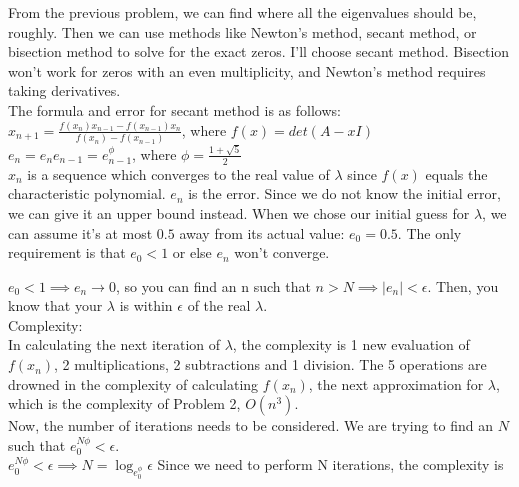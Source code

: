 \documentclass[12pt]{article}
\newenvironment{problem}[2][Problem]{\begin{trivlist}
\item[\hskip \labelsep {\bfseries #1}\hskip \labelsep {\bfseries #2.}]}{\end{trivlist}}
\begin{document}
\begin{problem}{4}
\end{problem}

From the previous problem, we can find where all the eigenvalues should be, roughly. Then we can use methods like Newton's method, secant method, or bisection method to solve for the exact zeros. I'll choose secant method. Bisection won't work for zeros with an even multiplicity, and Newton's method requires taking derivatives.
\\

The formula and error for secant method is as follows:
\\

$x_{n+1}=\frac{f(x_n)x_{n-1} - f(x_{n-1})x_n}{f(x_n)-f(x_{n-1})}$, where $f(x)=det(A-xI)$
\\

$e_n=e_n e_{n-1}=e_{n-1}^{\phi}$, where $\phi = \frac{1+\sqrt5}{2}$
\\

$x_n$ is a sequence which converges to the real value of $\lambda$ since $f(x)$ equals the characteristic polynomial. $e_n$ is the error. Since we do not know the initial error, we can give it an upper bound instead. When we chose our initial guess for $\lambda$, we can assume it's at most $0.5$ away from its actual value: $e_0=0.5$. The only requirement is that $e_0<1$ or else $e_n$ won't converge.

$e_0<1\implies e_n \to 0$, so you can find an n such that $n>N \implies |e_n|<\epsilon$. Then, you know that your $\lambda$ is within $\epsilon$ of the real $\lambda$.
\\

Complexity:
\\

In calculating the next iteration of $\lambda$, the complexity is 1 new evaluation of $f(x_n)$, 2 multiplications, 2 subtractions and 1 division. The 5 operations are drowned in the complexity of calculating $f(x_n)$, the next approximation for $\lambda$, which is the complexity of Problem 2, $O(n^3)$.
\\

Now, the number of iterations needs to be considered. We are trying to find an $N$ such that $e_0^{N\phi}<\epsilon$.
\\

$e_0^{N\phi}<\epsilon \implies N = \log_{e_0^\phi} \epsilon$
Since we need to perform N iterations, the complexity is
\\
\end{document}
